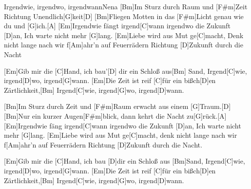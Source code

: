 \documentclass[../main.tex]{subfiles}
\begin{document}
\begin{song}{Irgendwie, irgendwo, irgendwann}{Nena}{}
[Bm]Im Sturz durch Raum und [F#m]Zeit Richtung Unendlich[G]keit[D]{\hh}
[Bm]Fliegen Motten in das [F#m]Licht genau wie du und [G]ich.[A]{\hh}
[Em]Irgendwie fängt irgend[C]wann irgendwo die Zukunft [D]an,
Ich warte nicht mehr [G]lang. [Em]Liebe wird aus Mut ge[C]macht,
Denk nicht lange nach wir f[Am]ahr'n auf Feuerrädern
Richtung [D]Zukunft durch die Nacht

[Em]Gib mir die [C]Hand, ich bau'[D] dir ein Schloß aus[Bm] Sand,
Irgend[C]wie, irgend[D]wo, irgend[G]wann.
[Em]Die Zeit ist reif [C]für ein bißch[D]en Zärtlichkeit,[Bm]{\hh}
Irgend[C]wie, irgend[G]wo, irgend[D]wann.

[Bm]Im Sturz durch Zeit und [F#m]Raum erwacht aus einem [G]Traum.[D]{\hh}
[Bm]Nur ein kurzer Augen[F#m]blick, dann kehrt die Nacht zu[G]rück.[A]{\hh}
[Em]Irgendwie fäng irgend[C]wann irgendwo die Zukunft [D]an,
Ich warte nicht mehr [G]lang. [Em]Liebe wird aus Mut ge[C]macht,
denk nicht lange nach wir f[Am]ahr'n auf Feuerrädern
Richtung [D]Zukunft durch die Nacht.

[Em]Gib mir die [C]Hand, ich bau [D]dir ein Schloß aus [Bm]Sand,
Irgend[C]wie, irgend[D]wo, irgend[G]wann.
[Em]Die Zeit ist reif [C]für ein bißch[D]en Zärtlichkeit,[Bm]{\hh}
Irgend[C]wie, irgend[G]wo, irgend[D]wann.
\end{song}
\end{document}
